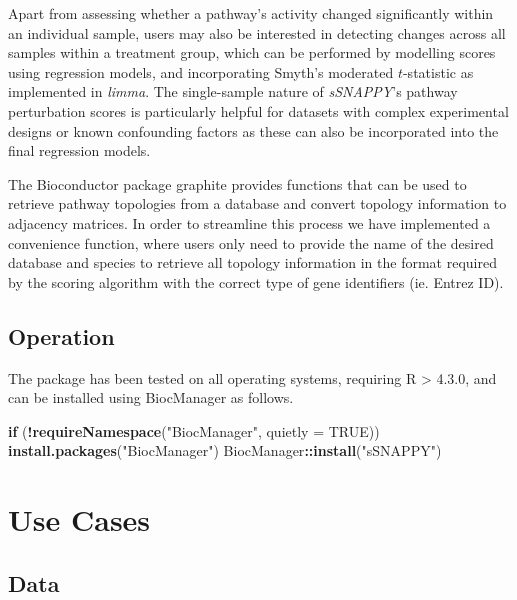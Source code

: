 \documentclass[9pt,a4paper,]{extarticle}
\newenvironment{Shaded}{\begin{snugshade}}{\end{snugshade}}
\newcommand{\AttributeTok}[1]{\textcolor[rgb]{0.13,0.29,0.53}{#1}}
\newcommand{\ConstantTok}[1]{\textcolor[rgb]{0.56,0.35,0.01}{#1}}
\newcommand{\ControlFlowTok}[1]{\textcolor[rgb]{0.13,0.29,0.53}{\textbf{#1}}}
\newcommand{\FunctionTok}[1]{\textcolor[rgb]{0.13,0.29,0.53}{\textbf{#1}}}
\newcommand{\NormalTok}[1]{#1}
\newcommand{\SpecialCharTok}[1]{\textcolor[rgb]{0.81,0.36,0.00}{\textbf{#1}}}
\newcommand{\StringTok}[1]{\textcolor[rgb]{0.31,0.60,0.02}{#1}}
\begin{document}
Apart from assessing whether a pathway's activity changed significantly within an individual sample, users may also be interested in detecting changes across all samples within a treatment group, which can be performed by modelling scores using regression models, and incorporating Smyth's moderated \(t\)-statistic\citep{Smyth_2004} as implemented in \emph{limma}\citep{limma_2015}.
The single-sample nature of \emph{sSNAPPY}'s pathway perturbation scores is particularly helpful for datasets with complex experimental designs or known confounding factors as these can also be incorporated into the final regression models.

The Bioconductor package graphite\citep{Sales2012} provides functions that can be used to retrieve pathway topologies from a database and convert topology information to adjacency matrices.
In order to streamline this process we have implemented a convenience function, where users only need to provide the name of the desired database and species to retrieve all topology information in the format required by the scoring algorithm with the correct type of gene identifiers (ie. Entrez ID).

\hypertarget{operation}{%
\subsection{Operation}\label{operation}}

The package has been tested on all operating systems, requiring R \textgreater{} 4.3.0, and can be installed using BiocManager as follows.

\begin{Shaded}
\begin{Highlighting}[]
\ControlFlowTok{if}\NormalTok{ (}\SpecialCharTok{!}\FunctionTok{requireNamespace}\NormalTok{(}\StringTok{"BiocManager"}\NormalTok{, }\AttributeTok{quietly =} \ConstantTok{TRUE}\NormalTok{))}
  \FunctionTok{install.packages}\NormalTok{(}\StringTok{"BiocManager"}\NormalTok{)}
\NormalTok{BiocManager}\SpecialCharTok{::}\FunctionTok{install}\NormalTok{(}\StringTok{"sSNAPPY"}\NormalTok{)}
\end{Highlighting}
\end{Shaded}

\hypertarget{use-cases}{%
\section{Use Cases}\label{use-cases}}

\hypertarget{data}{%
\subsection{Data}\label{data}}
\end{document}
